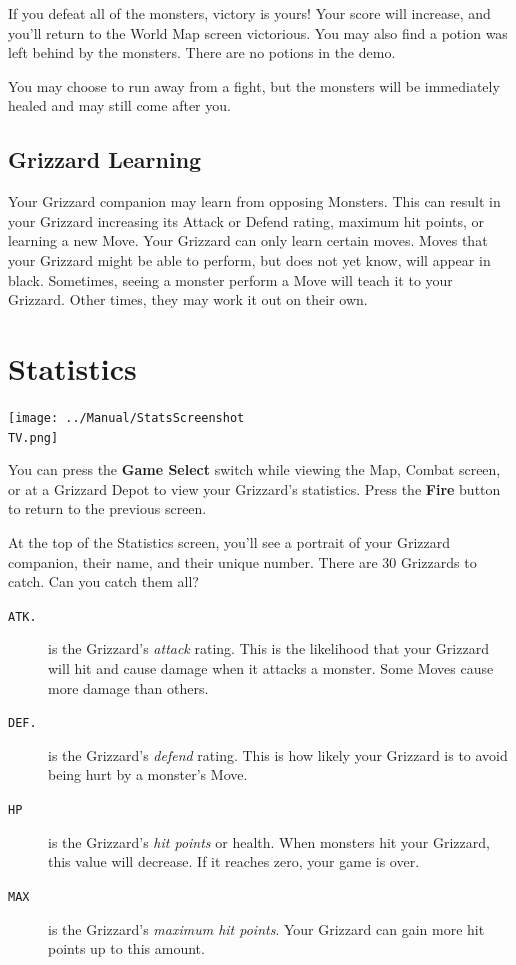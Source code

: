 \documentclass[10pt,twocolumn,openany,article]{memoir}
\newcommand\TV{NTSC}
\newcommand\TV{PAL}
\newcommand\TV{SECAM}
\begin{document}
If you  defeat all of  the monsters, victory  is yours! Your  score will
increase, and you'll return to the  World Map screen victorious. You may
also find a potion was left behind by the monsters. \ifdefined\DEMO\else
There are no potions in the demo. \fi

You  may choose  to run  away from  a fight,  but the  monsters will  be
immediately healed and may still come after you.

\subsection{Grizzard Learning}

Your  Grizzard companion  may  learn from  opposing  Monsters. This  can
result in your Grizzard increasing  its Attack or Defend rating, maximum
hit points, or learning a new Move. Your Grizzard can only learn certain
moves. Moves that  your Grizzard might be able to  perform, but does not
yet  know, will  appear in  black. Sometimes,  seeing a  monster perform
a Move will teach it to your Grizzard. Other times, they may work it out
on their own.

\section{Statistics}

\begin{center}
  \texttt{[image: ../Manual/StatsScreenshot\\TV.png]}
\end{center}

You can  press the  \textbf{Game Select} switch  while viewing  the Map,
Combat  screen,  or  at  a   Grizzard  Depot  to  view  your  Grizzard's
statistics.   Press  the   \textbf{Fire}   button  to   return  to   the
previous screen.

At  the top  of the  Statistics screen,  you'll see  a portrait  of your
Grizzard companion,  their name, and  their unique number. There  are 30
Grizzards to catch. Can you catch them all?

\begin{description}
  
\item[\texttt{ATK.}] is the Grizzard's  \emph{attack} rating. This is the
  likelihood  that your  Grizzard  will  hit and  cause  damage when  it
  attacks a monster. Some Moves cause more damage than others.
  
\item[\texttt{DEF.}] is the Grizzard's  \emph{defend} rating. This is how
  likely your Grizzard is to avoid being hurt by a monster's Move.

\item[\texttt{HP}]  is  the  Grizzard's  \emph{hit  points}  or  health.
  When  monsters hit  your Grizzard,  this  value will  decrease. If  it
  reaches zero, your game is over.

\item[\texttt{MAX}]  is   the  Grizzard's  \emph{maximum   hit  points}.
  Your Grizzard can gain more hit points up to this amount.
  
\end{description}
\end{document}
